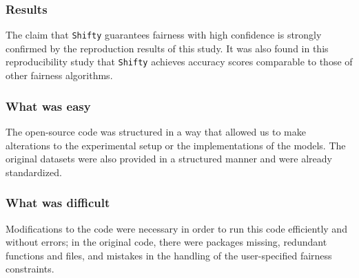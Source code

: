 \subsubsection*{Results}

The claim that \texttt{Shifty} guarantees fairness with high confidence is strongly confirmed by the reproduction results of this study. It was also found in this reproducibility study that \texttt{Shifty} achieves accuracy scores comparable to those of other fairness algorithms.


\subsubsection*{What was easy}

The open-source code was structured in a way that allowed us to make alterations to the experimental setup or the implementations of the models. The original datasets were also provided in a structured manner and were already standardized.

\subsubsection*{What was difficult}

Modifications to the code were necessary in order to run this code efficiently and without errors; in the original code, there were packages missing, redundant functions and files, and mistakes in the handling of the user-specified fairness constraints. 

